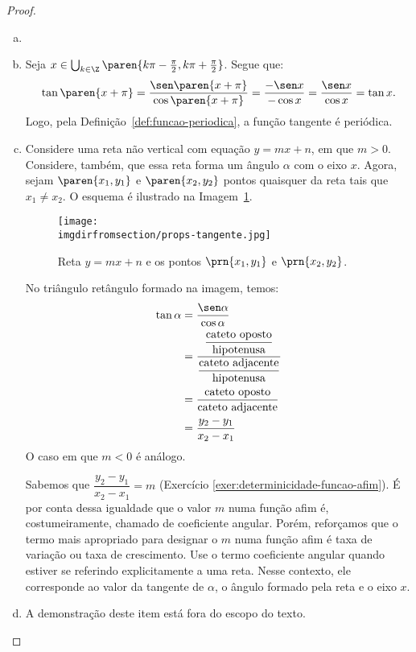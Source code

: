 \begin{proof}
  \begin{enumerate}[(a)]
    \item[]
    \item Seja $x \in \bigcup_{k \in \Z} \paren{k \pi - \frac{\pi} 2, k \pi + \frac {\pi} 2}$. 
  Segue que: $$\tan \paren{x+\pi} = \frac{\sen \paren{x+\pi}}{\cos \paren{x+\pi}}= \frac{-\sen x}{-\cos x}= \frac{\sen x}{\cos x}= \tan x.$$
  Logo, pela Definição~\ref{def:funcao-periodica}, a função tangente é periódica.
  \item Considere uma reta não vertical com equação $y=mx+n$, em que $m > 0$. 
  Considere, também, que essa reta forma um ângulo $\alpha$ com o eixo $x$. 
  Agora, sejam $\paren {x_1, y_1}$ e $\paren{x_2, y_2}$ pontos quaisquer da reta tais que $x_1 \neq x_2$. 
  O esquema é ilustrado na Imagem~\ref{img:prova-props-tangente}. 
  \begin{figure}[H]
      \centering
      \texttt{[image: \\imgdirfromsection/props-tangente.jpg]}
      \caption{Reta $y = mx + n$ e os pontos $\prn{x_1, y_1}$ e $\prn{x_2, y_2}$.}
      \label{img:prova-props-tangente}
  \end{figure}
  No triângulo retângulo formado na imagem, temos:
  \begin{align*}
    \tan \alpha &= \frac {\sen\alpha}{\cos\alpha} \\ 
    &= \frac{ \dfrac{\text{cateto oposto}}{\text{hipotenusa}}   }{\dfrac{\text{cateto adjacente}}{\text{hipotenusa}}} \\
    &= \frac{\text{cateto oposto}}{\text{cateto adjacente}}\\
    &= \frac{y_2 - y_1}{x_2 - x_1}
  \end{align*}
  O caso em que $m < 0$ é análogo.

  Sabemos que $\dfrac{y_2 - y_1}{x_2 - x_1} = m$ (Exercício \ref{exer:determinicidade-funcao-afim}).
  É por conta dessa igualdade que o valor $m$ numa função afim é, costumeiramente, chamado de coeficiente angular. Porém, reforçamos que o termo mais apropriado para designar o $m$ numa função afim é taxa de variação ou taxa de crescimento. Use o termo coeficiente angular quando estiver se referindo explicitamente a uma reta. Nesse contexto, ele corresponde ao valor da tangente de $\alpha$, o ângulo formado pela reta e o eixo $x$.
  \item A demonstração deste item está fora do escopo do texto.
  \end{enumerate}

  
\end{proof}